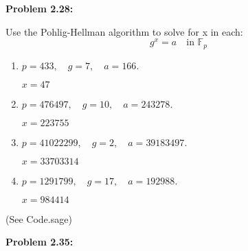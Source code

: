 \documentclass[a4paper, 11pt]{article}
\begin{document}
    

\noindent\textbf{Problem 2.28:}

    Use the Pohlig-Hellman algorithm to solve for x in each:
    \begin{equation*}
        g^x = a \quad \text{in }\mathbb{F}_p
    \end{equation*}
    \begin{enumerate}[label=(\alph*)]
        \item $p=433, \quad g=7, \quad a=166.$
        
        $x=47$
        \item $p=476497, \quad g=10, \quad a=243278.$
        
        $x=223755$
        \item $p=41022299, \quad g=2, \quad a=39183497.$
        
        $x=33703314$
        \item $p=1291799, \quad g=17, \quad a=192988.$
        
        $x=984414$
    \end{enumerate}
    (See Code.sage)
    

\noindent\textbf{Problem 2.35:}
\end{document}
